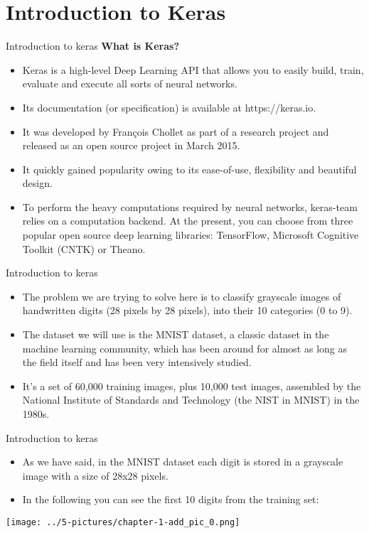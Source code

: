 \documentclass[11pt]{beamer}
\begin{document}
\section{Introduction to Keras}
\begin{frame}{Introduction to keras}
\textbf{What is Keras?}
	\begin{itemize}
	\item Keras is a high-level Deep Learning API that allows you to easily build, train, evaluate and execute all sorts of neural networks. 
	\item Its documentation (or specification) is available at https://keras.io. \item It was developed by François Chollet as part of a research project and released as an open source project in March 2015. 
\item It quickly gained popularity owing to its ease-of-use, flexibility and beautiful design. 
\item To perform the heavy computations required by neural networks, keras-team relies on a computation backend. At the present, you can choose from three popular open source deep learning libraries: TensorFlow, Microsoft Cognitive Toolkit (CNTK) or Theano.
	\end{itemize}
\end{frame}
\begin{frame}{Introduction to keras}
	\begin{itemize}
	\item The problem we are trying to solve here is to classify grayscale images of handwritten digits (28 pixels by 28 pixels), into their 10 categories (0 to 9). 
	\item The dataset we will use is the MNIST dataset, a classic dataset in the machine learning community, which has been around for almost as long as the field itself and has been very intensively studied. 
	\item It's a set of 60,000 training images, plus 10,000 test images, assembled by the National Institute of Standards and Technology (the NIST in MNIST) in the 1980s. 
	\end{itemize}
\end{frame}
\begin{frame}{Introduction to keras}
	\begin{itemize}
		\item As we have said, in the MNIST dataset each digit is stored in a grayscale image with a size of 28x28 pixels. 
		\item In the following you can see the first 10 digits from the training set:
	\end{itemize}
	\begin{center}
	\texttt{[image: ../5-pictures/chapter-1-add\_pic\_0.png]}
	\end{center}
\end{frame}
\end{document}
